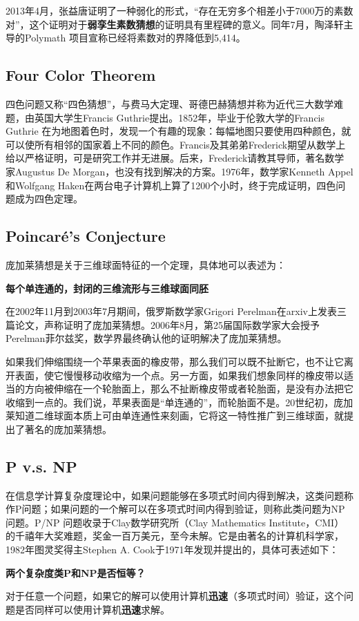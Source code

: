 2013年4月，张益唐证明了一种弱化的形式，“存在无穷多个相差小于7000万的素数对”，这个证明对于\textbf{弱孪生素数猜想}的证明具有里程碑的意义。同年7月，陶泽轩主导的Polymath 项目宣称已经将素数对的界降低到5,414。

\subsection{Four Color Theorem}
四色问题又称“四色猜想”，与费马大定理、哥德巴赫猜想并称为近代三大数学难题，由英国大学生Francis Guthrie提出。1852年，毕业于伦敦大学的Francis Guthrie 在为地图着色时，发现一个有趣的现象：每幅地图只要使用四种颜色，就可以使所有相邻的国家着上不同的颜色。Francis及其弟弟Frederick期望从数学上给以严格证明，可是研究工作并无进展。后来，Frederick请教其导师，著名数学家Augustus De Morgan，也没有找到解决的方案。1976年，数学家Kenneth Appel和Wolfgang Haken在两台电子计算机上算了1200个小时，终于完成证明，四色问题成为四色定理。
\subsection{Poincar\'{e}'s Conjecture}
庞加莱猜想是关于三维球面特征的一个定理，具体地可以表述为：\\
\centerline{\textbf{每个单连通的，封闭的三维流形与三维球面同胚}}

在2002年11月到2003年7月期间，俄罗斯数学家Grigori Perelman在arxiv上发表三篇论文，声称证明了庞加莱猜想。2006年8月，第25届国际数学家大会授予Perelman菲尔兹奖，数学界最终确认他的证明解决了庞加莱猜想。

如果我们伸缩围绕一个苹果表面的橡皮带，那么我们可以既不扯断它，也不让它离开表面，使它慢慢移动收缩为一个点。另一方面，如果我们想象同样的橡皮带以适当的方向被伸缩在一个轮胎面上，那么不扯断橡皮带或者轮胎面，是没有办法把它收缩到一点的。我们说，苹果表面是“单连通的”，而轮胎面不是。20世纪初，庞加莱知道二维球面本质上可由单连通性来刻画，它将这一特性推广到三维球面，就提出了著名的庞加莱猜想。

\subsection{P v.s. NP}
在信息学计算复杂度理论中，如果问题能够在多项式时间内得到解决，这类问题称作P问题；如果问题的一个解可以在多项式时间内得到验证，则称此类问题为NP问题。P/NP 问题收录于Clay数学研究所（Clay Mathematics Institute，CMI）的千禧年大奖难题，奖金一百万美元，至今未解。它是由著名的计算机科学家，1982年图灵奖得主Stephen A. Cook\cite{cook1971complexity}于1971年发现并提出的，具体可表述如下：\\
\centerline{\textbf{两个复杂度类P和NP是否恒等？}}
对于任意一个问题，如果它的解可以使用计算机\textbf{迅速}（多项式时间）验证，这个问题是否同样可以使用计算机\textbf{迅速}求解。

